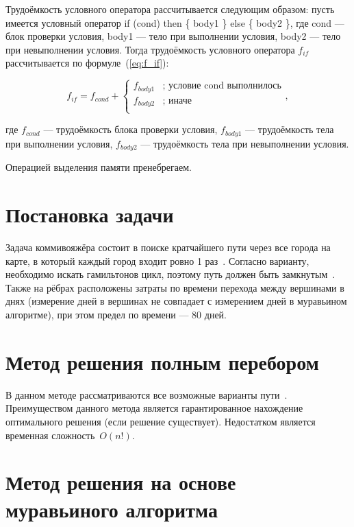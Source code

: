 Трудоёмкость условного оператора рассчитывается следующим образом: пусть имеется условный оператор if (cond) then \{ body1 \} else \{ body2 \}, где cond --- блок проверки условия, body1 --- тело при выполнении условия, body2 --- тело при невыполнении условия. Тогда трудоёмкость условного оператора $f_{if}$ рассчитывается по формуле~(\ref{eq:f_if}):

\begin{equation}
	\label{eq:f_if}
	f_{if} = f_{cond} + \begin{cases}
		f_{body1} & \text{; условие cond выполнилось}\\
		f_{body2} & \text{; иначе}\\
	\end{cases},
\end{equation}

где $f_{cond}$ --- трудоёмкость блока проверки условия, $ f_{body1}$ --- трудоёмкость тела при выполнении условия, $ f_{body2}$ --- трудоёмкость тела при невыполнении условия.

Операцией выделения памяти пренебрегаем.

\section{Постановка задачи}

Задача коммивояжёра состоит в поиске кратчайшего пути через все города на карте, в который каждый город входит ровно 1 раз~\cite{borozdov}. Согласно варианту, необходимо искать гамильтонов цикл, поэтому путь должен быть замкнутым~\cite{netcycle}. Также на рёбрах расположены затраты по времени перехода между вершинами в днях (измерение дней в вершинах не совпадает с измерением дней в муравьином алгоритме), при этом предел по времени --- 80 дней.

\section{Метод решения полным перебором}

В данном методе рассматриваются все возможные варианты пути~\cite{borozdov}. Преимуществом данного метода является гарантированное нахождение оптимального решения (если решение существует). Недостатком является временная сложность~$O(n!)$.

\section{Метод решения на основе муравьиного алгоритма}

